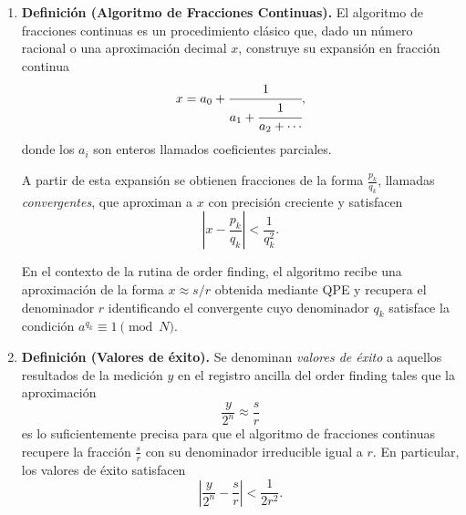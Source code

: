 \documentclass[letterpaper]{article}
\begin{document}
\begin{enumerate}
El procedimiento emplea el algoritmo de Quantum Phase Estimation (QPE) sobre el operador unitario
\[
U\ket{x} = \ket{a x \bmod N},
\]
cuyos autovectores son los estados periódicos asociados al orden $r$ y cuyos autovalores tienen la forma $e^{2\pi i s/r}$ para algún entero 
$0 \le s \le r-1$.

QPE se implementa preparando un registro de control en superposición uniforme mediante puertas Hadamard, seguido de la aplicación de potencias controladas del unitario $U$, de la forma $U^{2^k}$. Esta interacción codifica la fase $s/r$ en el registro ancilla. Finalmente, se aplica la Transformada de Fourier Cuántica inversa (QFT$^{-1}$) y se mide dicho registro.

La medición produce en el registro ancilla una aproximación a la fracción
\[
\frac{s}{r},
\]
donde $s$ es un entero tal que $0 \le s \le r-1$. A partir de esta aproximación se recupera el orden $r$ mediante el algoritmo clásico de fracciones continuas.

\item\textbf{Definición (Algoritmo de Fracciones Continuas).}
El algoritmo de fracciones continuas es un procedimiento clásico que, dado un número racional o una aproximación decimal $x$, construye su expansión en fracción continua
\[
x = a_0 + \cfrac{1}{a_1 + \cfrac{1}{a_2 + \cdots}},
\]
donde los $a_i$ son enteros llamados coeficientes parciales.

A partir de esta expansión se obtienen fracciones de la forma 
$\frac{p_k}{q_k}$, llamadas \emph{convergentes}, que aproximan a $x$ con precisión creciente y satisfacen
\[
\left| x - \frac{p_k}{q_k} \right| < \frac{1}{q_k^2}.
\]

En el contexto de la rutina de order finding, el algoritmo recibe una aproximación de la forma $x \approx s/r$ obtenida mediante QPE y recupera el denominador $r$ identificando el convergente cuyo denominador $q_k$ satisface la condición $a^{q_k} \equiv 1 \pmod{N}$.

\item\textbf{Definición (Valores de éxito).}
Se denominan \emph{valores de éxito} a aquellos resultados de la medición $y$ en el registro ancilla del order finding tales que la aproximación
\[
\frac{y}{2^n} \approx \frac{s}{r}
\]
es lo suficientemente precisa para que el algoritmo de fracciones continuas recupere la fracción $\frac{s}{r}$ con su denominador irreducible igual a 
$r$. En particular, los valores de éxito satisfacen
\[
\left| \frac{y}{2^n} - \frac{s}{r} \right| < \frac{1}{2r^2}.
\]


\end{enumerate}
\end{document}
